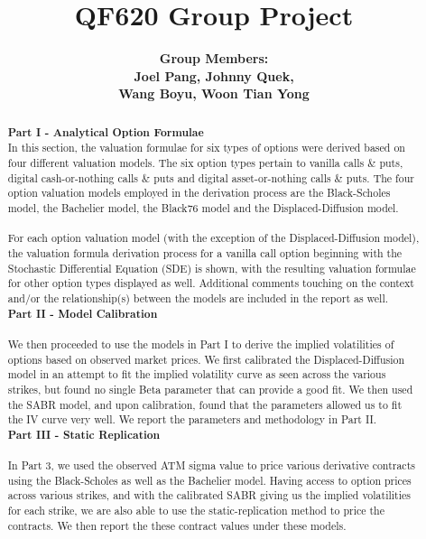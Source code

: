 \documentclass{article}
\title{\textbf{QF620 Group Project}}
\author{\textbf{Group Members:} \\ \textbf{Joel Pang, Johnny Quek,} \\ \textbf{Wang Boyu, Woon Tian Yong}}
\date{}
\begin{document}
	\maketitle
		
	\begin{abstract}
		\noindent \textbf{Part I - Analytical Option Formulae} \\
		
		\noindent In this section, the valuation formulae for six types of options were derived based on four different valuation models. The six option types pertain to vanilla calls \& puts, digital cash-or-nothing calls \& puts and digital asset-or-nothing calls \& puts. The four option valuation models employed in the derivation process are the Black-Scholes model, the Bachelier model, the Black76 model and the Displaced-Diffusion model. \\ \\
		\noindent For each option valuation model (with the exception of the Displaced-Diffusion model), the valuation formula derivation process for a vanilla call option beginning with the Stochastic Differential Equation (SDE) is shown, with the resulting valuation formulae for other option types displayed as well. Additional comments touching on the context and/or the relationship(s) between the models are included in the report as well.\\
		
		\noindent \textbf{Part II - Model Calibration}\\ \\
		\noindent We then proceeded to use the models in Part I to derive the implied volatilities of options based on observed market prices. We first calibrated the Displaced-Diffusion model in an attempt to fit the implied volatility curve as seen across the various strikes, but found no single Beta parameter that can provide a good fit. We then used the SABR model, and upon calibration, found that the parameters allowed us to fit the IV curve very well. We report the parameters and methodology in Part II. \\
		
		\noindent \textbf{Part III - Static Replication}\\ \\		
		In Part 3, we used the observed ATM sigma value to price various derivative contracts using the Black-Scholes as well as the Bachelier model. Having access to option prices across various strikes, and with the calibrated SABR giving us the implied volatilities for each strike, we are also able to use the static-replication method to price the contracts. We then report the these contract values under these models. \\
		

\end{abstract}
\end{document}
